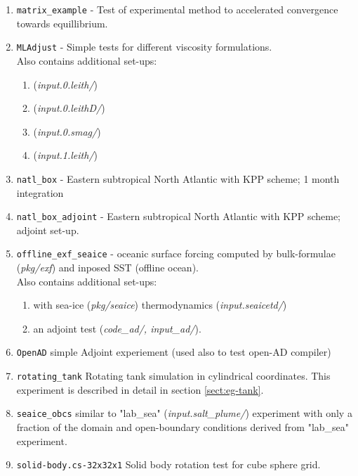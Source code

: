 \begin{enumerate}
\item \texttt{matrix\_example} - Test of experimental method to
  accelerated convergence towards equillibrium.

\item \texttt{MLAdjust} - Simple tests for different viscosity formulations.\\
  Also contains additional set-ups:
  \begin{enumerate}
   \item ({\it input.0.leith/})
   \item ({\it input.0.leithD/})
   \item ({\it input.0.smag/})
   \item ({\it input.1.leith/})
  \end{enumerate}

\item \texttt{natl\_box} - Eastern subtropical North Atlantic with KPP
  scheme; 1 month integration

\item \texttt{natl\_box\_adjoint} - Eastern subtropical North Atlantic with KPP
  scheme; adjoint set-up.

\item \texttt{offline\_exf\_seaice} - oceanic surface forcing computed
  by bulk-formulae ({\it pkg/exf}) and inposed SST (offline ocean).\\
  Also contains additional set-ups:
  \begin{enumerate}
   \item with sea-ice ({\it pkg/seaice}) thermodynamics ({\it input.seaicetd/})
   \item an adjoint test ({\it code\_ad/, input\_ad/}).
  \end{enumerate}
  
\item \texttt{OpenAD} simple Adjoint experiement (used also to test 
  open-AD compiler)

\item \texttt{rotating\_tank} Rotating tank simulation in cylindrical
  coordinates.  This experiment is described in detail in section
  \ref{sect:eg-tank}.

\item \texttt{seaice\_obcs} similar to "lab\_sea" ({\it input.salt\_plume/})
  experiment with only a fraction of the domain and open-boundary conditions
  derived from "lab\_sea" experiment.

\item \texttt{solid-body.cs-32x32x1} Solid body rotation test for cube
  sphere grid.


\end{enumerate}
